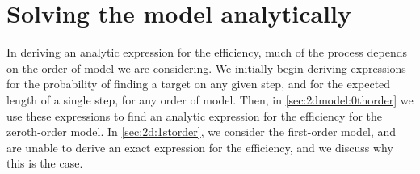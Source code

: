 \iffalse
\begin{figure}
	\begin{center}
		\begin{tikzpicture}
		\filldraw[black] (0,0) circle (2pt) node[anchor=north west] {$(x_i,y_i)$};
		
		\draw[black] (-2,2) circle (1);
		\filldraw[black] (-2,2) circle (2pt); 
		\draw[black](-2,2) -- (-1,2) node[anchor=north east] {$r_v$};
		
		\draw[black] (3,-1) circle (1);
		\filldraw[black] (3,-1) circle (2pt); 
		\draw[black](3,-1) -- (4,-1) node[anchor=north east] {$r_v$};
		
		\draw[black] (3.5,3) circle (1);
		\filldraw[black] (3.5,3) circle (2pt); 
		\draw[black](3.5,3) -- (4.5,3) node[anchor=north east] {$r_v$};
		\end{tikzpicture}
		\caption{Example layout for two-dimensional search model. targets are represented by points, and are spread out about the search space. The forager's radius of vision is represented by the circles around the targets, within which the forager can locate the food.  \label{fig:2dtargets}}
	\end{center}
\end{figure}
\fi



\section{Solving the model analytically}

In deriving an analytic expression for the efficiency, much of the process depends on the order of model we are considering. We initially begin deriving expressions for the probability of finding a target on any given step, and for the expected length of a single step, for any order of model. Then, in \cref{sec:2dmodel:0thorder} we use these expressions to find an analytic expression for the efficiency for the zeroth-order model. In \cref{sec:2d:1storder}, we consider the first-order model, and are unable to derive an exact expression for the efficiency, and we discuss why this is the case.

